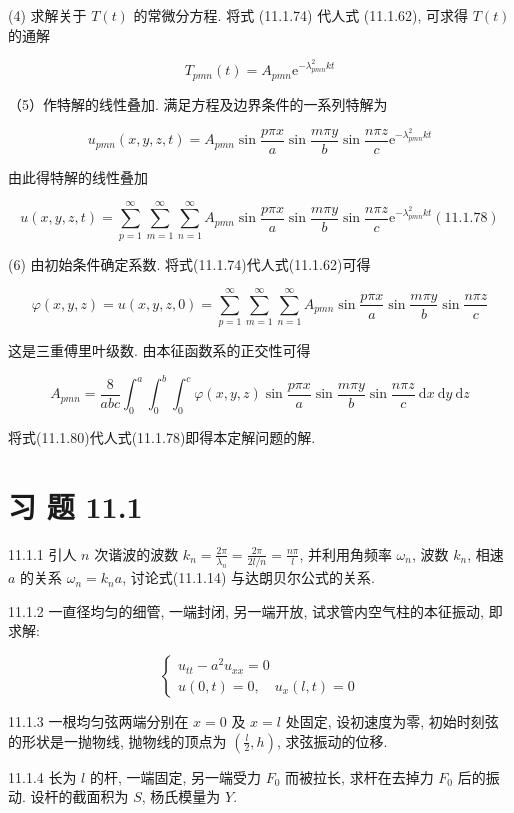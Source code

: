(4) 求解关于 $T(t)$ 的常微分方程. 将式 (11.1.74) 代人式 (11.1.62), 可求得 $T(t)$ 的通解

$$
T_{p m n}(t)=A_{p m n} \mathrm{e}^{-\lambda_{p m n}^{2} k t}
$$

（5）作特解的线性叠加. 满足方程及边界条件的一系列特解为

$$
u_{p m n}(x, y, z, t)=A_{p m n} \sin \frac{p \pi x}{a} \sin \frac{m \pi y}{b} \sin \frac{n \pi z}{c} \mathrm{e}^{-\lambda_{p m n}^{2} k t}
$$

由此得特解的线性叠加

$$
u(x, y, z, t)=\sum_{p=1}^{\infty} \sum_{m=1}^{\infty} \sum_{n=1}^{\infty} A_{p m n} \sin \frac{p \pi x}{a} \sin \frac{m \pi y}{b} \sin \frac{n \pi z}{c} \mathrm{e}^{-\lambda_{p m n}^{2} k t}(11.1 .78)
$$

(6) 由初始条件确定系数. 将式(11.1.74)代人式(11.1.62)可得

$$
\varphi(x, y, z)=u(x, y, z, 0)=\sum_{p=1}^{\infty} \sum_{m=1}^{\infty} \sum_{n=1}^{\infty} A_{p m n} \sin \frac{p \pi x}{a} \sin \frac{m \pi y}{b} \sin \frac{n \pi z}{c}
$$

这是三重傅里叶级数. 由本征函数系的正交性可得

$$
A_{p m n}=\frac{8}{a b c} \int_{0}^{a} \int_{0}^{b} \int_{0}^{c} \varphi(x, y, z) \sin \frac{p \pi x}{a} \sin \frac{m \pi y}{b} \sin \frac{n \pi z}{c} \mathrm{~d} x \mathrm{~d} y \mathrm{~d} z
$$

将式(11.1.80)代人式(11.1.78)即得本定解问题的解.

\section{习 题 11.1}
11.1.1 引人 $n$ 次谐波的波数 $k_{n}=\frac{2 \pi}{\lambda_{n}}=\frac{2 \pi}{2 l / n}=\frac{n \pi}{l}$, 并利用角频率 $\omega_{n}$, 波数 $k_{n}$, 相速 $a$ 的关系 $\omega_{n}=k_{n} a$, 讨论式(11.1.14) 与达朗贝尔公式的关系.

11.1.2 一直径均匀的细管, 一端封闭, 另一端开放, 试求管内空气柱的本征振动, 即求解:

$$
\left\{\begin{array}{l}
u_{t t}-a^{2} u_{x x}=0 \\
u(0, t)=0, \quad u_{x}(l, t)=0
\end{array}\right.
$$

11.1.3 一根均匀弦两端分别在 $x=0$ 及 $x=l$ 处固定, 设初速度为零, 初始时刻弦的形状是一抛物线, 抛物线的顶点为 $\left(\frac{l}{2}, h\right)$, 求弦振动的位移.

11.1.4 长为 $l$ 的杆, 一端固定, 另一端受力 $F_{0}$ 而被拉长, 求杆在去掉力 $F_{0}$ 后的振动. 设杆的截面积为 $S$, 杨氏模量为 $Y$.

